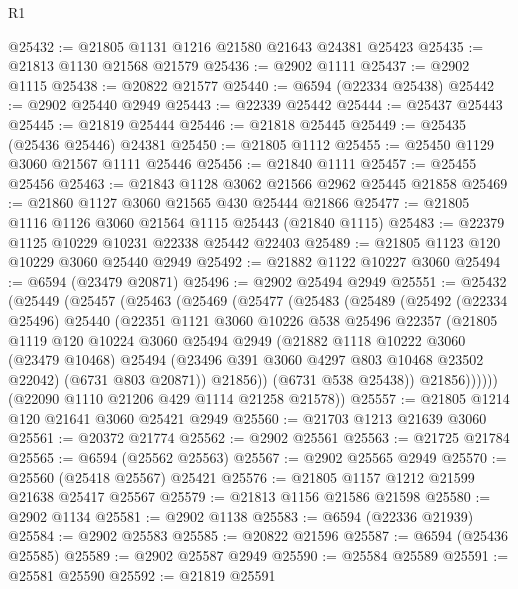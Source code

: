 \begin{lexlean}{R1}
\begin{coremodule}
@25432 := @21805 @1131 @1216 @21580 @21643 @24381 @25423
@25435 := @21813 @1130 @21568 @21579
@25436 := @2902 @1111
@25437 := @2902 @1115
@25438 := @20822 @21577
@25440 := @6594 (@22334 @25438)
@25442 := @2902 @25440 @2949
@25443 := @22339 @25442
@25444 := @25437 @25443
@25445 := @21819 @25444
@25446 := @21818 @25445
@25449 := @25435 (@25436 @25446) @24381
@25450 := @21805 @1112
@25455 := @25450 @1129 @3060 @21567 @1111 @25446
@25456 := @21840 @1111
@25457 := @25455 @25456
@25463 := @21843 @1128 @3062 @21566 @2962 @25445 @21858
@25469 := @21860 @1127 @3060 @21565 @430 @25444 @21866
@25477 := @21805 @1116 @1126 @3060 @21564 @1115 @25443 (@21840 @1115)
@25483 := @22379 @1125 @10229 @10231 @22338 @25442 @22403
@25489 := @21805 @1123 @120 @10229 @3060 @25440 @2949
@25492 := @21882 @1122 @10227 @3060
@25494 := @6594 (@23479 @20871)
@25496 := @2902 @25494 @2949
@25551 := @25432
    (@25449
      (@25457
        (@25463
          (@25469
            (@25477
              (@25483
                (@25489
                  (@25492
                    (@22334 @25496)
                    @25440
                    (@22351
                      @1121
                      @3060
                      @10226
                      @538
                      @25496
                      @22357
                      (@21805
                        @1119
                        @120
                        @10224
                        @3060
                        @25494
                        @2949
                        (@21882
                          @1118
                          @10222
                          @3060
                          (@23479 @10468)
                          @25494
                          (@23496 @391 @3060 @4297 @803 @10468 @23502 @22042)
                          (@6731 @803 @20871))
                        @21856))
                    (@6731 @538 @25438))
                  @21856))))))
      (@22090 @1110 @21206 @429 @1114 @21258 @21578))
@25557 := @21805 @1214 @120 @21641 @3060 @25421 @2949
@25560 := @21703 @1213 @21639 @3060
@25561 := @20372 @21774
@25562 := @2902 @25561
@25563 := @21725 @21784
@25565 := @6594 (@25562 @25563)
@25567 := @2902 @25565 @2949
@25570 := @25560 (@25418 @25567) @25421
@25576 := @21805 @1157 @1212 @21599 @21638 @25417 @25567
@25579 := @21813 @1156 @21586 @21598
@25580 := @2902 @1134
@25581 := @2902 @1138
@25583 := @6594 (@22336 @21939)
@25584 := @2902 @25583
@25585 := @20822 @21596
@25587 := @6594 (@25436 @25585)
@25589 := @2902 @25587 @2949
@25590 := @25584 @25589
@25591 := @25581 @25590
@25592 := @21819 @25591

\end{coremodule}
\end{lexlean}
